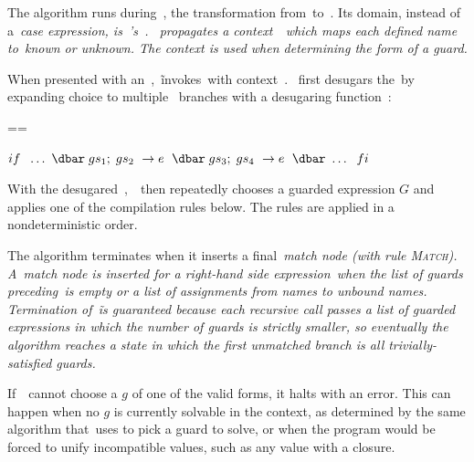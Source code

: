 \documentclass[manuscript,screen, 12pt, nonacm]{acmart}
\begin{document}
    The algorithm runs during~\DTran, the transformation from~\VMinus to~\D. Its
    domain, instead of a~\it{case} expression, is~\VMinus's~\iffibf.
    \DTran~propagates a context~\ctx\ which maps each defined name to~\it{known} or
    \it{unknown}. The context is used when determining the form of a guard.
       




    When presented with an~\iffibf,~\DTran\~invokes~\Compile with context~\ctx.
    \Compile~first desugars the~\iffibf by expanding choice to multiple~\iffibf
    branches with a desugaring function~\ITran: 
    
    
    ==
    
    ${if\;~\dots~\dbar\; gs_{1};\; gs_{2}~\rightarrow e~\;\dbar\; gs_{3};\; gs_{4}~\rightarrow e~\;\dbar~\dots~\;fi}$

    With the desugared~\iffibf,~\Compile\ then repeatedly chooses a guarded
    expression $G$ and applies one of the compilation rules below. The rules are
    applied in a nondeterministic order. 

    The algorithm terminates when it inserts a final~\it{match} node (with rule
    \textsc{Match}).  A~\it{match} node is inserted for a right-hand side expression~\expr when the list of
    guards preceding~\expr is empty or a list of assignments from names to
    unbound names. Termination of~\DTran\~is guaranteed because each recursive
    call passes a list of guarded expressions in which the number of guards is
    strictly smaller, so eventually the algorithm reaches a state in which the
    first unmatched branch is all trivially-satisfied guards.


    If~\Compile\ cannot choose a $g$ of
    one of the valid forms, it halts with an error. This
    can happen when no $g$ is currently solvable in the context, as determined
    by the same algorithm that~\VMinus uses to pick a guard to solve, or when
    the program would be forced to unify incompatible values, such as any value
    with a closure. 
\end{document}
